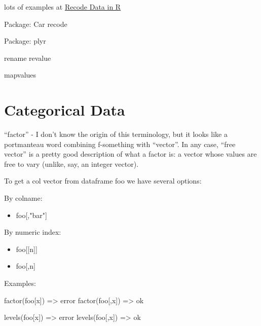 lots of examples at \href{http://rprogramming.net/recode-data-in-r/}{Recode Data in R}

Package:  Car
  recode


Package:  plyr

rename
revalue

mapvalues




\section{Categorical Data}

``factor'' - I don't know the origin of this terminology, but it looks
like a portmanteau word combining f-something with ``vector''.  In any
case, ``free vector'' is a pretty good description of what a factor
is: a vector whose values are free to vary (unlike, say, an integer
vector).

To get a col vector from dataframe foo we have several options:

\noindent By colname:

\begin{itemize}
\item foo[,"bar"]
\end{itemize}

\noindent By numeric index:

\begin{itemize}
\item foo[[n]]
\item foo[,n]
\end{itemize}

Examples:

	factor(foo[x])  => error
	factor(foo[,x])  => ok

	levels(foo[x])  => error
	levels(foo[,x])  => ok

